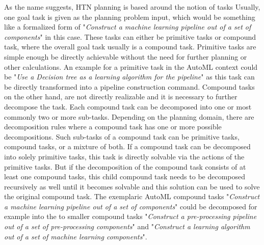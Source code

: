 As the name suggests, HTN planning is based around the notion of tasks
Usually, one goal task is given as the planning problem input, which would be something like a formalized form of "\textit{Construct a machine learning pipeline out of a set of components}" in this case.
These tasks can either be primitive tasks or compound task, where the overall goal task usually is a compound task.
Primitive tasks are simple enough be directly achievable without the need for further planning or other calculations.
An example for a primitive task in the AutoML context could be "\textit{Use a Decision tree as a learning algorithm for the pipeline}" as this task can be directly transformed into a pipeline construction command.\newline
Compound tasks on the other hand, are not directly realizable and it is necessary to further decompose the task.
Each compound task can be decomposed into one or most commonly two or more sub-tasks.
Depending on the planning domain, there are decomposition rules where a compound task has one or more possible decompositions.
Such sub-tasks of a compound task can be primitive tasks, compound tasks, or a mixture of both.\newline
If a compound task can be decomposed into solely primitive tasks, this task is directly solvable via the actions of the primitive tasks.
But if the decomposition of the compound task consists of at least one compound tasks, this child compound task needs to be decomposed recursively as well until it becomes solvable and this solution can be used to solve the original compound task.
The exemplaric AutoML compound tasks "\textit{Construct a machine learning pipeline out of a set of components}" could be decomposed for example into the to smaller compound tasks "\textit{Construct a pre-processing pipeline out of a set of pre-processing components}" and "\textit{Construct a learning algorithm out of a set of machine learning components}".

